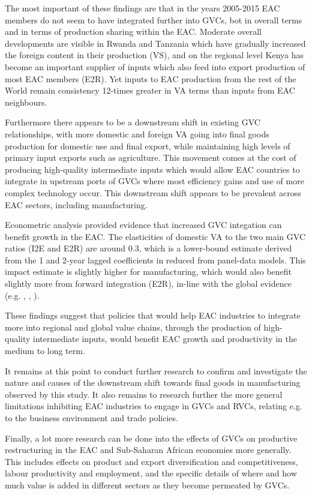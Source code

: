 \documentclass[a4paper]{article}
\begin{document}
The most important of these findings are that in the years 2005-2015 EAC members do not seem to have integrated further into GVCs, bot in overall terms and in terms of production sharing within the EAC. Moderate overall developments are visible in Rwanda and Tanzania which have gradually increased the foreign content in their production (VS), and on the regional level Kenya has become an important supplier of inputs which also feed into export production of most EAC members (E2R). Yet inputs to EAC production from the rest of the World remain consistency 12-times greater in VA terms than inputs from EAC neighbours. \newline

Furthermore there appears to be a downstream shift in existing GVC relationships, with more domestic and foreign VA going into final goods production for domestic use and final export, while maintaining high levels of primary input exports such as agriculture. This movement comes at the cost of producing high-quality intermediate inputs which would allow EAC countries to integrate in upstream ports of GVCs where most efficiency gains and use of more complex technology occur. This downstream shift appears to be prevalent across EAC sectors, including manufacturing. \newline

Econometric analysis provided evidence that increased GVC integation can benefit growth in the EAC. The elasticities of domestic VA to the two main GVC ratios  (I2E and E2R) are around 0.3, which is a lower-bound estimate derived from the 1 and 2-year lagged coefficients in reduced from panel-data models.  This impact estimate is slightly higher for manufacturing, which would also benefit slightly more from forward integration (E2R), in-line with the global evidence (e.g.  \citet{Kummritz20161}, \citet{kummritz2015global}, \citet{foster2015global}). \newline

These findings suggest that policies that would help EAC industries to integrate more into regional and global value chains, through the production of high-quality intermediate inputs, would benefit EAC growth and productivity in the medium to long term. \newline 

It remains at this point to conduct further research to confirm and investigate the nature and causes of the downstream shift towards final goods in manufacturing observed by this study. It also remains to research further the more general limitations inhibiting EAC industries to engage in GVCs and RVCs, relating e.g. to the business environment and trade policies. \newline

Finally, a lot more research can be done into the effects of GVCs on productive restructuring in the EAC and Sub-Saharan African economies more generally. This includes effects on product and export diversification and competitiveness, labour productivity and employment, and the specific details of where and how much value is added in different sectors as they become permeated by GVCs.



\newpage


\end{document}
